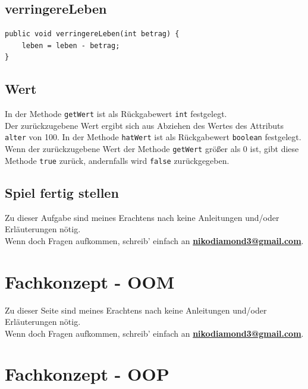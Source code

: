 \documentclass{scrartcl}   %
\begin{document}
\subsection{verringereLeben}

\begin{lstlisting}
public void verringereLeben(int betrag) {
    leben = leben - betrag;
}
\end{lstlisting}

\subsection{Wert}

\begin{itemize}
    \barrow In der Methode \texttt{getWert} ist als Rückgabewert \texttt{int} festgelegt.\\
    Der zurückzugebene Wert ergibt sich aus Abziehen des Wertes des Attributs \texttt{alter} von 100.
    \barrow In der Methode \texttt{hatWert} ist als Rückgabewert \texttt{boolean} festgelegt.\\
    Wenn der zurückzugebene Wert der Methode \texttt{getWert} größer als 0 ist, gibt diese Methode \texttt{true} zurück, andernfalls wird \texttt{false} zurückgegeben.
\end{itemize}

\subsection{Spiel fertig stellen}

Zu dieser Aufgabe sind meines Erachtens nach keine Anleitungen und/oder Erläuterungen nötig.\\
Wenn doch Fragen aufkommen, schreib' einfach an \textbf{\href{mailto:nikodiamond3@gmail.com}{nikodiamond3@gmail.com}}.

\newpage

\section{Fachkonzept - OOM}

Zu dieser Seite sind meines Erachtens nach keine Anleitungen und/oder Erläuterungen nötig.\\
Wenn doch Fragen aufkommen, schreib' einfach an \textbf{\href{mailto:nikodiamond3@gmail.com}{nikodiamond3@gmail.com}}.

\newpage

\section{Fachkonzept - OOP}
\end{document}
